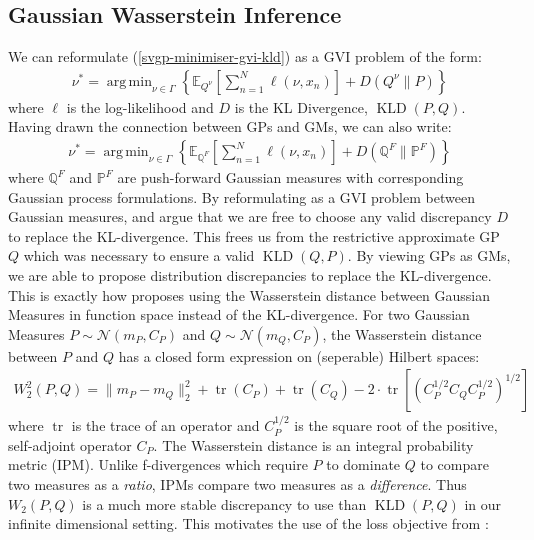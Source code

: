 \documentclass[twoside,11pt]{article}
\newcommand{\KLD}{\operatorname{KLD}}
\newcommand{\tr}{\operatorname{tr}}
\DeclareMathOperator*{\argmin}{arg\,min}
\begin{document}
\subsection{Gaussian Wasserstein Inference}
We can reformulate (\ref{svgp-minimiser-gvi-kld}) as a GVI problem of the form:
\begin{align}
    \label{svgp-gwi-gp}
    \nu^* = \argmin_{\nu \in \Gamma} \left\{ \mathbb{E}_{Q^{\nu}}\left[\sum_{n=1}^N \ell(\nu, x_n)\right] + D(Q^{\nu}\|P)\right\}
\end{align}
where $\ell$ is the log-likelihood and $D$ is the KL Divergence, $\KLD(P, Q)$. Having drawn the connection between GPs and GMs, we can also write:
\begin{align}
    \label{svgp-gwi-gm}
    \nu^* = \argmin_{\nu \in \Gamma} \left\{ \mathbb{E}_{\mathbb{Q}^F}\left[\sum_{n=1}^N \ell(\nu, x_n)\right] + D(\mathbb{Q}^F\|\mathbb{P}^F)\right\}
\end{align}
where $\mathbb{Q}^F$ and $\mathbb{P}^F$ are push-forward Gaussian measures with corresponding Gaussian process formulations. By reformulating as a GVI problem between Gaussian measures, \cite{wild2022generalized} and \cite{knoblauch2022optimization} argue that we are free to choose any valid discrepancy $D$ to replace the KL-divergence. This frees us from the restrictive approximate GP $Q$ which was necessary to ensure a valid $\KLD(Q,  P)$. By viewing GPs as GMs, we are able to propose distribution discrepancies to replace the KL-divergence. This is exactly how \cite{wild2022generalized} proposes using the Wasserstein distance between Gaussian Measures in function space instead of the KL-divergence. For two Gaussian Measures $P \sim \mathcal{N}(m_P, C_P)$ and $Q \sim \mathcal{N}(m_Q, C_P)$, the Wasserstein distance between $P$ and $Q$ has a closed form expression on (seperable) Hilbert spaces:
\begin{align}
    \label{wasserstein-distance}
    W_2^2(P, Q) = \| m_P - m_Q\|_2^2 + \tr(C_P) + \tr(C_Q) - 2 \cdot \tr \left[ \left( C_P^{1/2} C_Q C_P^{1/2}\right)^{1/2}\right]
\end{align}
where $\tr$ is the trace of an operator and $C_P^{1/2}$ is the square root of the positive, self-adjoint operator $C_P$. The Wasserstein distance is an integral probability metric (IPM). Unlike f-divergences which require $P$ to dominate $Q$ to compare two measures as a \textit{ratio}, IPMs compare two measures as a \textit{difference}. Thus $W_2(P, Q)$ is a much more stable discrepancy to use than $\KLD(P, Q)$ in our infinite dimensional setting. This motivates the use of the loss objective from \cite{wild2022generalized}:
\end{document}
